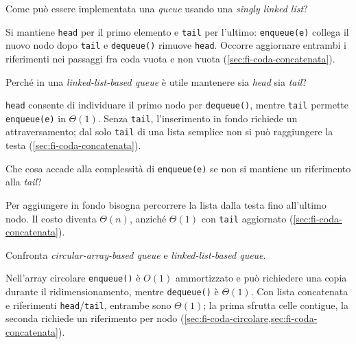 \begin{exercise}
\label{ex:fi-esercizi-strutture-dati-queue-linked-implementazione}
Come può essere implementata una \emph{queue} usando una \emph{singly linked
list}?
\end{exercise}

Si mantiene \texttt{head} per il primo elemento e \texttt{tail} per l'ultimo:
\texttt{enqueue(e)} collega il nuovo nodo dopo \texttt{tail} e
\texttt{dequeue()} rimuove \texttt{head}. Occorre aggiornare entrambi i
riferimenti nei passaggi fra coda vuota e non vuota
(\cref{sec:fi-coda-concatenata}).

\begin{exercise}
\label{ex:fi-esercizi-strutture-dati-queue-head-tail-utilita}
Perché in una \emph{linked-list-based queue} è utile mantenere sia \emph{head}
sia \emph{tail}?
\end{exercise}

\texttt{head} consente di individuare il primo nodo per \texttt{dequeue()},
mentre \texttt{tail} permette \texttt{enqueue(e)} in \(\Theta(1)\). Senza
\texttt{tail}, l'inserimento in fondo richiede un attraversamento;
dal solo \texttt{tail} di una lista semplice non si può raggiungere
la testa (\cref{sec:fi-coda-concatenata}).

\begin{exercise}
\label{ex:fi-esercizi-strutture-dati-queue-senza-tail}
Che cosa accade alla complessità di \texttt{enqueue(e)} se non si mantiene un
riferimento alla \emph{tail}?
\end{exercise}

Per aggiungere in fondo bisogna percorrere la lista dalla testa fino all'ultimo
nodo. Il costo diventa \(\Theta(n)\), anziché \(\Theta(1)\) con \texttt{tail}
aggiornato (\cref{sec:fi-coda-concatenata}).

\begin{exercise}
\label{ex:fi-esercizi-strutture-dati-queue-array-vs-linked}
Confronta \emph{circular-array-based queue} e \emph{linked-list-based queue}.
\end{exercise}

Nell'array circolare \texttt{enqueue()} è \(O(1)\) ammortizzato e può richiedere
una copia durante il ridimensionamento, mentre \texttt{dequeue()} è
\(\Theta(1)\). Con lista concatenata e riferimenti \texttt{head}/\texttt{tail},
entrambe sono \(\Theta(1)\); la prima sfrutta celle contigue, la seconda
richiede un riferimento per nodo
(\cref{sec:fi-coda-circolare,sec:fi-coda-concatenata}).

